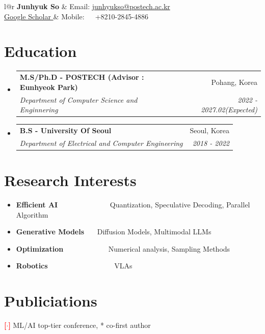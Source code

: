\documentclass[a4paper,20pt]{article}
\makeatletter
\newcommand{\resumeItem}[2]{
  \item\small{
    \textbf{#1}{ #2 \vspace{-2pt}}
  }
}
\newcommand{\resumeSubheading}[4]{
  \vspace{-1pt}\item
    \begin{tabular*}{0.97\textwidth}{l@{\extracolsep{\fill}}r}
      \textbf{#1} & #2 \\
      \textit{#3} & \textit{#4} \\
    \end{tabular*}\vspace{-5pt}
}
\newcommand{\resumeSubItem}[2]{\resumeItem{#1}{#2}\vspace{-3pt}}
\newcommand{\resumeSubHeadingListStart}{\begin{itemize}[leftmargin=*]}
\newcommand{\resumeSubHeadingListEnd}{\end{itemize}}
\makeatother
\begin{document}
\begin{tabular*}{\textwidth}{l@{\extracolsep{\fill}}r}
  \textbf{{\LARGE Junhyuk So}} & Email: \href{mailto:junhyukso@postech.ac.kr}{junhyukso@postech.ac.kr}\\
  \href{https://scholar.google.com/citations?hl=ko&user=uYE7vtEAAAAJ}{Google Scholar } & Mobile:~~~+8210-2845-4886 \\
\end{tabular*}

      

\section{Education}
  \resumeSubHeadingListStart
    \resumeSubheading
      {M.S/Ph.D - POSTECH (Advisor : Eunhyeok Park)}{Pohang, Korea}
      {Department of Computer Science and Enginnering}{2022 - 2027.02(Expected)}
    \resumeSubheading
      {B.S - University Of Seoul}{Seoul, Korea}
      {Department of Electrical and Computer Engineering}{2018 - 2022}
    \resumeSubHeadingListEnd

\vspace{-5pt}
\section{Research Interests}
	\resumeSubHeadingListStart
    	\resumeSubItem{Efficient AI}{~~~~~~~~~~~~~~Quantization, Speculative Decoding,  Parallel Algorithm}
	\resumeSubItem{Generative Models}{~~~Diffusion Models, Multimodal LLMs}
	\resumeSubItem{Optimization}{~~~~~~~~~~~~Numerical analysis, Sampling Methods}
    \resumeSubItem{Robotics}{~~~~~~~~~~~~~~~~~~VLAs}
\resumeSubHeadingListEnd
\vspace{1pt}
\section{Publiciations}
 \textcolor{red}{\textbf{[$\cdot$]}} ML/AI top-tier conference, * co-first author
\end{document}
